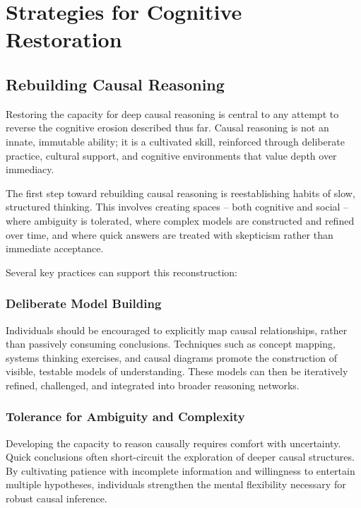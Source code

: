 \chapter{Strategies for Cognitive Restoration}

\section{Rebuilding Causal Reasoning}

Restoring the capacity for deep causal reasoning is central to any
attempt to reverse the cognitive erosion described thus far. Causal
reasoning is not an innate, immutable ability; it is a cultivated skill,
reinforced through deliberate practice, cultural support, and cognitive
environments that value depth over immediacy.

The first step toward rebuilding causal reasoning is reestablishing
habits of slow, structured thinking. This involves creating spaces --
both cognitive and social -- where ambiguity is tolerated, where complex
models are constructed and refined over time, and where quick answers
are treated with skepticism rather than immediate acceptance.

Several key practices can support this reconstruction:

\subsection{Deliberate Model Building}

Individuals should be encouraged to explicitly map causal relationships,
rather than passively consuming conclusions. Techniques such as concept
mapping, systems thinking exercises, and causal diagrams promote the
construction of visible, testable models of understanding. These models
can then be iteratively refined, challenged, and integrated into broader
reasoning networks.

\subsection{Tolerance for Ambiguity and Complexity}

Developing the capacity to reason causally requires comfort with
uncertainty. Quick conclusions often short-circuit the exploration of
deeper causal structures. By cultivating patience with incomplete
information and willingness to entertain multiple hypotheses,
individuals strengthen the mental flexibility necessary for robust
causal inference.

